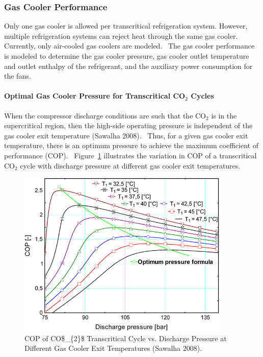 \subsubsection{Gas Cooler Performance}\label{gas-cooler-performance}

Only one gas cooler is allowed per transcritical refrigeration system. However, multiple refrigeration systems can reject heat through the same gas cooler.~ Currently, only air-cooled gas coolers are modeled.~ The gas cooler performance is modeled to determine the gas cooler pressure, gas cooler outlet temperature and outlet enthalpy of the refrigerant, and the auxiliary power consumption for the fans.

\paragraph{\texorpdfstring{Optimal Gas Cooler Pressure for Transcritical CO\(_{2}\) Cycles}{Optimal Gas Cooler Pressure for Transcritical CO\_\{2\} Cycles}}\label{optimal-gas-cooler-pressure-for-transcritical-coux5f2-cycles}

When the compressor discharge conditions are such that the CO\(_{2}\) is in the supercritical region, then the high-side operating pressure is independent of the gas cooler exit temperature (Sawalha 2008).~ Thus, for a given gas cooler exit temperature, there is an optimum pressure to achieve the maximum coefficient of performance (COP).~ Figure~\ref{fig:cop-of-co_2-transcritical-cycle-vs.-discharge} illustrates the variation in COP of a transcritical CO\(_{2}\) cycle with discharge pressure at different gas cooler exit temperatures.

\begin{figure}[hbtp] %
\centering
\includegraphics[width=0.9\textwidth, height=0.9\textheight, keepaspectratio=true]{media/image6342.png}
\caption{  COP of CO\$\_\{2\}\$ Transcritical Cycle vs. Discharge Pressure at Different Gas Cooler Exit Temperatures (Sawalha 2008). \protect \label{fig:cop-of-co_2-transcritical-cycle-vs.-discharge}}
\end{figure}

